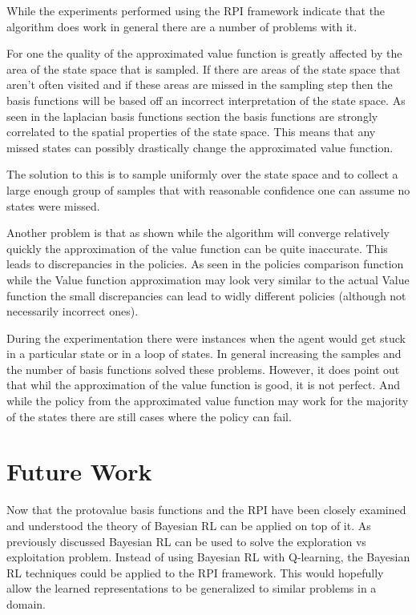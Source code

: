 \documentclass[12pt, letterpaper, final]{report}
\begin{document}
While the experiments performed using the RPI framework indicate that
the algorithm does work in general there are a number of problems with
it.

For one the quality of the approximated value function is greatly
affected by the area of the state space that is sampled. If there are
areas of the state space that aren't often visited and if these areas
are missed in the sampling step then the basis functions will be based
off an incorrect interpretation of the state space. As seen in the
laplacian basis functions section the basis functions are strongly
correlated to the spatial properties of the state space. This means
that any missed states can possibly drastically change the
approximated value function.

The solution to this is to sample uniformly over the state space and
to collect a large enough group of samples that with reasonable
confidence one can assume no states were missed.

Another problem is that as shown while the algorithm will converge
relatively quickly the approximation of the value function can be
quite inaccurate. This leads to discrepancies in the policies. As seen
in the policies comparison function while the Value function
approximation may look very similar to the actual Value function the
small discrepancies can lead to widly different policies (although not
necessarily incorrect ones). 

During the experimentation there were
instances when the agent would get stuck in a particular state or in a
loop of states. In general increasing the samples and the number of
basis functions solved these problems. However, it does point out that
whil the approximation of the value function is good, it is not
perfect. And while the policy from the approximated value function may
work for the majority of the states there are still cases where the
policy can fail.

\section{Future Work}

Now that the protovalue basis functions and the RPI have been closely
examined and understood the theory of Bayesian RL can be applied on
top of it. As previously discussed Bayesian RL can be used to solve
the exploration vs exploitation problem. Instead of using Bayesian RL
with Q-learning, the Bayesian RL techniques could be applied to the
RPI framework. This would hopefully allow the learned representations
to be generalized to similar problems in a domain. 
\end{document}

